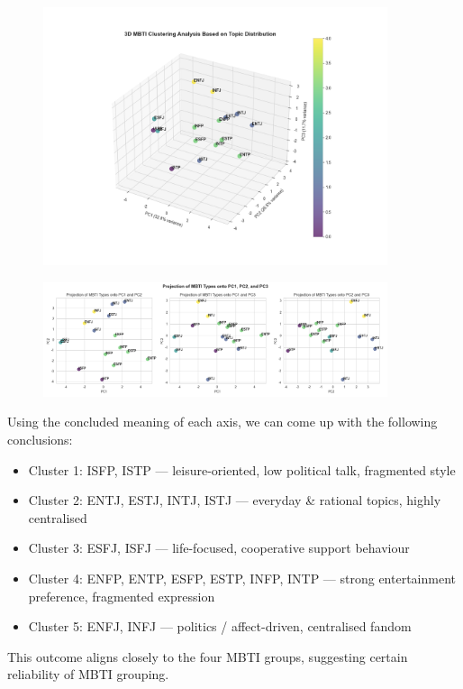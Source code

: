 \documentclass[12pt]{article}
\begin{document}
	\begin{figure}[H]
			\centering
			\includegraphics[width=0.9\textwidth]{Q23D} 	
	\end{figure}
	\begin{figure}[H]
			\centering
			\includegraphics[width=0.9\textwidth]{Q22D} 	
	\end{figure}
	
	Using the concluded meaning of each axis, we can come up with the following conclusions:
	\begin{itemize}
	\item Cluster 1: ISFP, ISTP — leisure-oriented, low political talk, fragmented style
	\item Cluster 2: ENTJ, ESTJ, INTJ, ISTJ — everyday \& rational topics, highly centralised
	\item Cluster 3: ESFJ, ISFJ — life-focused, cooperative support behaviour
	\item Cluster 4: ENFP, ENTP, ESFP, ESTP, INFP, INTP — strong entertainment preference, fragmented expression
	\item Cluster 5: ENFJ, INFJ — politics / affect-driven, centralised fandom
	\end{itemize}
	
	This outcome aligns closely to the four MBTI groups, suggesting certain reliability of MBTI grouping.
	
\end{document}
